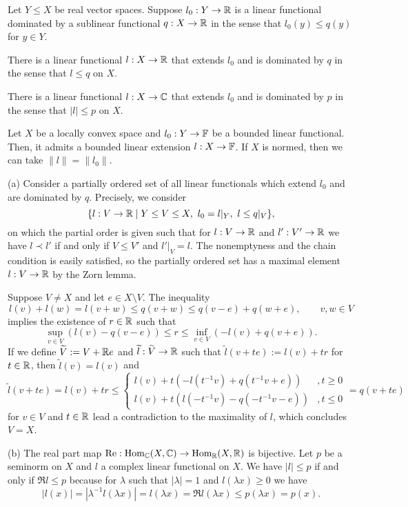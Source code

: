 \documentclass{../../large}
\begin{document}
\begin{prb}
Let $Y\le X$ be real vector spaces.
Suppose $l_0:Y\to\mathbb{R}$ is a linear functional dominated by a sublinear functional $q:X\to\mathbb{R}$ in the sense that $l_0(y)\le q(y)$ for $y\in Y$.
\begin{parts}
\item There is a linear functional $l:X\to\mathbb{R}$ that extends $l_0$ and is dominated by $q$ in the sense that $l\le q$ on $X$.
\item There is a linear functional $l:X\to\mathbb{C}$ that extends $l_0$ and is dominated by $p$ in the sense that $|l|\le p$ on $X$.
\item Let $X$ be a locally convex space and $l_0:Y\to\mathbb{F}$ be a bounded linear functional. Then, it admits a bounded linear extension $l:X\to\mathbb{F}$.
If $X$ is normed, then we can take $\|l\|=\|l_0\|$.
\end{parts}
\end{prb}
\begin{pf}
(a)
Consider a partially ordered set of all linear functionals which extend $l_0$ and are dominated by $q$.
Precisely, we consider
\[\{l:V\to\mathbb{R}\mid
Y\le V\le X,\ l_0=l|_Y,\ l\le q|_V\},\]
on which the partial order is given such that for $l:V\to\mathbb{R}$ and $l':V'\to\mathbb{R}$ we have $l\prec l'$ if and only if $V\le V'$ and $l'|_V=l$.
The nonemptyness and the chain condition is easily satisfied, so the partially ordered set has a maximal element $l:V\to\mathbb{R}$ by the Zorn lemma.

Suppose $V\ne X$ and let $e\in X\setminus V$.
The inequality
\[l(v)+l(w)=l(v+w)\le q(v+w)\le q(v-e)+q(w+e),\qquad v,w\in V\]
implies the existence of $r\in\mathbb{R}$ such that
\[\sup_{v\in V}(l(v)-q(v-e))\le r\le\inf_{v\in V}(-l(v)+q(v+e)).\]
If we define $\widetilde V:=V+\mathbb{R} e$ and $\widetilde l:\widetilde V\to\mathbb{R}$ such that $\tilde l(v+te):=l(v)+tr$ for $t\in\mathbb{R}$, then $\tilde l(v)=l(v)$ and
\[\tilde l(v+te)=l(v)+tr\le
\begin{cases}l(v)+t(-l(t^{-1}v)+q(t^{-1}v+e))&,t\ge0\\l(v)+t(l(-t^{-1}v)-q(-t^{-1}v-e))&,t\le0
\end{cases}
=q(v+te)
\]
for $v\in V$ and $t\in\mathbb{R}$ lead a contradiction to the maximality of $l$, which concludes $V=X$.

(b)
The real part map $\operatorname{Re}:\operatorname{Hom}_{\mathbb{C}}(X,\mathbb{C})\to\operatorname{Hom}_{\mathbb{R}}(X,\mathbb{R})$ is bijective.
Let $p$ be a seminorm on $X$ and $l$ a complex linear functional on $X$.
We have $|l|\le p$ if and only if $\Re l\le p$ because for $\lambda$ such that $|\lambda|=1$ and $l(\lambda x)\ge0$ we have
\[|l(x)|=|\lambda^{-1}l(\lambda x)|=l(\lambda x)=\Re l(\lambda x)\le p(\lambda x)=p(x).\]
\end{pf}
\end{document}
